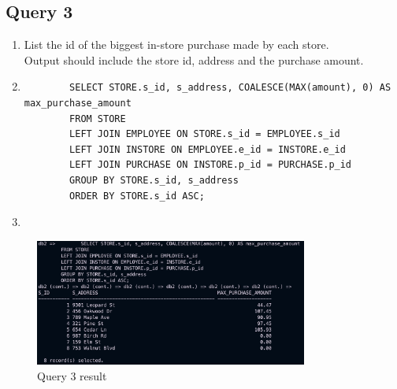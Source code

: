 \documentclass[a4paper,11pt]{article}
\begin{document}
\subsection*{Query 3}
\begin{enumerate}[label=(\alph*)]
    \item List the id of the biggest in-store purchase made by each store.\\
        Output should include the store id, address and the purchase amount.
    \item
        \begin{lstlisting}
        SELECT STORE.s_id, s_address, COALESCE(MAX(amount), 0) AS max_purchase_amount
        FROM STORE
        LEFT JOIN EMPLOYEE ON STORE.s_id = EMPLOYEE.s_id
        LEFT JOIN INSTORE ON EMPLOYEE.e_id = INSTORE.e_id
        LEFT JOIN PURCHASE ON INSTORE.p_id = PURCHASE.p_id
        GROUP BY STORE.s_id, s_address
        ORDER BY STORE.s_id ASC;
        \end{lstlisting}
    \item
\end{enumerate}
\begin{figure}[H]
    \centering
    \includegraphics[width=0.8\textwidth]{Query3.png}
    \caption{Query 3 result}
\end{figure}
\end{document}
